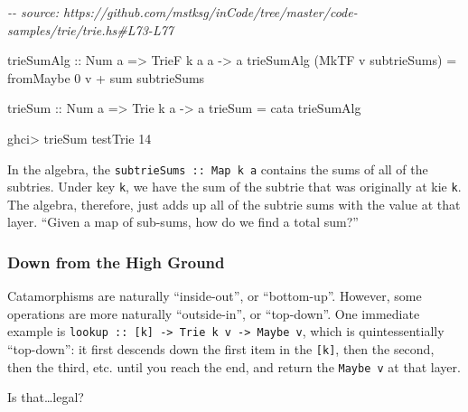 \documentclass[]{article}
\newenvironment{Shaded}{}{}
\newcommand{\CommentTok}[1]{\textcolor[rgb]{0.38,0.63,0.69}{\textit{#1}}}
\newcommand{\DataTypeTok}[1]{\textcolor[rgb]{0.56,0.13,0.00}{#1}}
\newcommand{\DecValTok}[1]{\textcolor[rgb]{0.25,0.63,0.44}{#1}}
\newcommand{\FunctionTok}[1]{\textcolor[rgb]{0.02,0.16,0.49}{#1}}
\newcommand{\NormalTok}[1]{#1}
\newcommand{\OperatorTok}[1]{\textcolor[rgb]{0.40,0.40,0.40}{#1}}
\newcommand{\OtherTok}[1]{\textcolor[rgb]{0.00,0.44,0.13}{#1}}
\begin{document}
\begin{Shaded}
\begin{Highlighting}[]
\CommentTok{{-}{-} source: https://github.com/mstksg/inCode/tree/master/code{-}samples/trie/trie.hs\#L73{-}L77}

\OtherTok{trieSumAlg ::} \DataTypeTok{Num}\NormalTok{ a }\OtherTok{=\textgreater{}} \DataTypeTok{TrieF}\NormalTok{ k a a }\OtherTok{{-}\textgreater{}}\NormalTok{ a}
\NormalTok{trieSumAlg (}\DataTypeTok{MkTF}\NormalTok{ v subtrieSums) }\OtherTok{=}\NormalTok{ fromMaybe }\DecValTok{0}\NormalTok{ v }\OperatorTok{+} \FunctionTok{sum}\NormalTok{ subtrieSums}

\OtherTok{trieSum ::} \DataTypeTok{Num}\NormalTok{ a }\OtherTok{=\textgreater{}} \DataTypeTok{Trie}\NormalTok{ k a }\OtherTok{{-}\textgreater{}}\NormalTok{ a}
\NormalTok{trieSum }\OtherTok{=}\NormalTok{ cata trieSumAlg}
\end{Highlighting}
\end{Shaded}

\begin{Shaded}
\begin{Highlighting}[]
\NormalTok{ghci}\OperatorTok{\textgreater{}}\NormalTok{ trieSum testTrie}
\DecValTok{14}
\end{Highlighting}
\end{Shaded}

In the algebra, the \texttt{subtrieSums\ ::\ Map\ k\ a} contains the sums of all
of the subtries. Under key \texttt{k}, we have the sum of the subtrie that was
originally at kie \texttt{k}. The algebra, therefore, just adds up all of the
subtrie sums with the value at that layer. ``Given a map of sub-sums, how do we
find a total sum?''

\subsubsection{Down from the High Ground}\label{down-from-the-high-ground}

Catamorphisms are naturally ``inside-out'', or ``bottom-up''. However, some
operations are more naturally ``outside-in'', or ``top-down''. One immediate
example is
\texttt{lookup\ ::\ {[}k{]}\ -\textgreater{}\ Trie\ k\ v\ -\textgreater{}\ Maybe\ v},
which is quintessentially ``top-down'': it first descends down the first item in
the \texttt{{[}k{]}}, then the second, then the third, etc. until you reach the
end, and return the \texttt{Maybe\ v} at that layer.

Is that\ldots legal?
\end{document}
